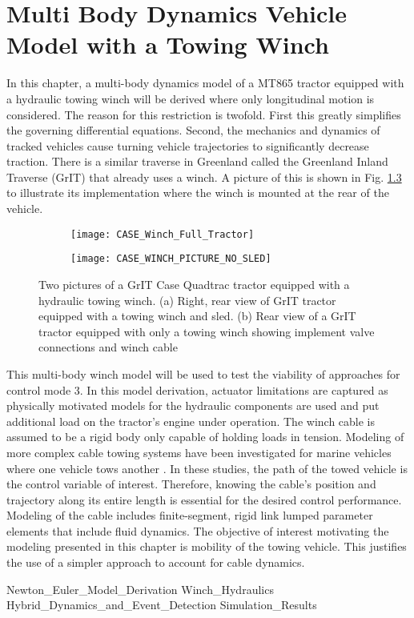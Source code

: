 \chapter{Multi Body Dynamics Vehicle Model with a Towing Winch}\label{ch:RMBDW}

In this chapter, a multi-body dynamics model of a MT865 tractor equipped with a hydraulic towing winch will be derived where only longitudinal motion is considered. The reason for this restriction is twofold. First this greatly simplifies the governing differential equations. Second, the mechanics and dynamics of tracked vehicles cause turning vehicle trajectories to significantly decrease traction. There is a similar traverse in Greenland called the Greenland Inland Traverse (GrIT) that already uses a winch. A picture of this is shown in Fig. \ref{fig:GrIT_CASE_Tractors} to illustrate its implementation where the winch is mounted at the rear of the vehicle. 
\begin{figure}[b]
\centering
\begin{subfigure}{0.6\textwidth}
\centering
\texttt{[image: CASE\_Winch\_Full\_Tractor]}
\caption{}
\label{fig:CASE_Winch_Full_Tractor}
\end{subfigure}
\begin{subfigure}{0.3\textwidth}
\centering
\texttt{[image: CASE\_WINCH\_PICTURE\_NO\_SLED]}
\caption{}
\label{fig:CASE_WINCH_PICTURE_NO_SLED}
\end{subfigure}
\caption{Two pictures of a GrIT Case Quadtrac tractor equipped with a hydraulic towing winch. (a) Right, rear view of GrIT tractor equipped with a towing winch and sled. (b) Rear view of a GrIT tractor equipped with only a towing winch showing implement valve connections and winch cable}
\label{fig:GrIT_CASE_Tractors}
\end{figure}
This multi-body winch model will be used to test the viability of approaches for control mode 3. In this model derivation, actuator limitations are captured as physically motivated models for the hydraulic components are used and put additional load on the tractor's engine under operation. The winch cable is assumed to be a rigid body only capable of holding loads in tension. Modeling of more complex cable towing systems have been investigated for marine vehicles where one vehicle tows another \cite{sanders1982three,kamman2001multibody,kamman1999modeling,milinazzo1987efficient}. In these studies, the path of the towed vehicle is the control variable of interest. Therefore, knowing the cable’s position and trajectory along its entire length is essential for the desired control performance. Modeling of the cable includes finite-segment, rigid link lumped parameter elements that include fluid dynamics. The objective of interest motivating the modeling presented in this chapter is mobility of the towing vehicle. This justifies the use of a simpler approach to account for cable dynamics. 

{Newton_Euler_Model_Derivation}
{Winch_Hydraulics}
{Hybrid_Dynamics_and_Event_Detection}
{Simulation_Results}